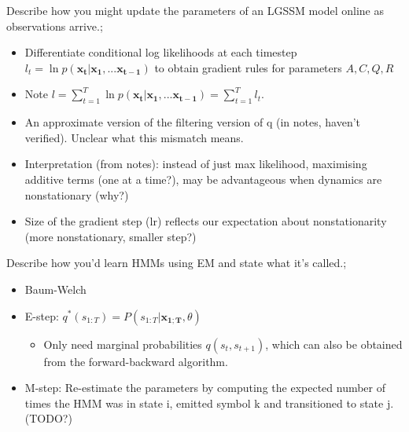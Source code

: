 \documentclass{article}
\begin{document}
Describe how you might update the parameters of an LGSSM model online as observations arrive.; \begin{itemize} \item Differentiate conditional log likelihoods at each timestep $l_t=\ln p(\mathbf{x_t|x_1,...x_{t-1}})$ to obtain gradient rules for parameters $A, C, Q, R$ \item Note $l=\sum_{t=1}^T\ln  p(\mathbf{x_t|x_1,...x_{t-1}})=\sum_{t=1}^Tl_t$. \item An approximate version of the filtering version of q (in notes, haven't verified). Unclear what this mismatch means. \item Interpretation (from notes): instead of just max likelihood, maximising additive terms (one at a time?), may be advantageous when dynamics are nonstationary (why?) \item Size of the gradient step (lr) reflects our expectation about nonstationarity (more nonstationary, smaller step?) \end{itemize}

Describe how you'd learn HMMs using EM and state what it's called.; \begin{itemize} \item Baum-Welch \item E-step: $q^*(s_{1:T})=P(s_{1:T}|\mathbf{x_{1;T}}, \theta)$ \begin{itemize} \item Only need marginal probabilities $q(s_t, s_{t+1})$, which can also be obtained from the forward-backward algorithm. \end{itemize} \item M-step: Re-estimate the parameters by computing the expected number of times the HMM was in state i, emitted symbol k and transitioned to state j. (TODO?) \end{itemize}
\end{document}
